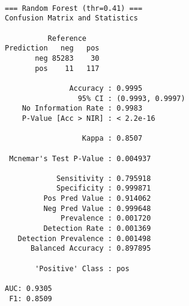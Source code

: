 \documentclass[
  11pt,
  letterpaper,
  DIV=11,
  numbers=noendperiod]{scrartcl}
\begin{document}
\begin{verbatim}

=== Random Forest (thr=0.41) ===
Confusion Matrix and Statistics

          Reference
Prediction   neg   pos
       neg 85283    30
       pos    11   117
                                          
               Accuracy : 0.9995          
                 95% CI : (0.9993, 0.9997)
    No Information Rate : 0.9983          
    P-Value [Acc > NIR] : < 2.2e-16       
                                          
                  Kappa : 0.8507          
                                          
 Mcnemar's Test P-Value : 0.004937        
                                          
            Sensitivity : 0.795918        
            Specificity : 0.999871        
         Pos Pred Value : 0.914062        
         Neg Pred Value : 0.999648        
             Prevalence : 0.001720        
         Detection Rate : 0.001369        
   Detection Prevalence : 0.001498        
      Balanced Accuracy : 0.897895        
                                          
       'Positive' Class : pos             
                                          
AUC: 0.9305 
 F1: 0.8509 
\end{verbatim}
\end{document}
